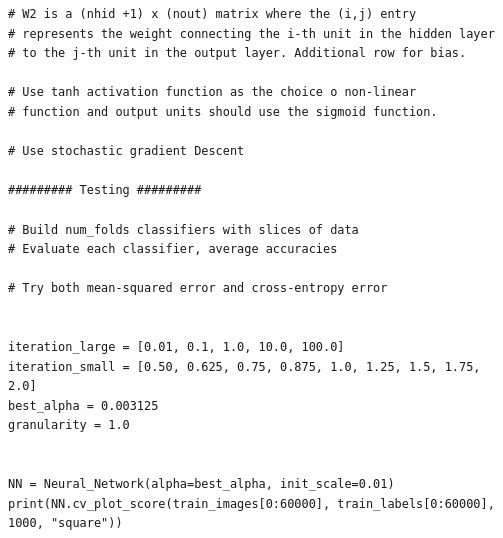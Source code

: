 \documentclass[11pt]{article}
\begin{document}
\begin{lstlisting}
# W2 is a (nhid +1) x (nout) matrix where the (i,j) entry
# represents the weight connecting the i-th unit in the hidden layer
# to the j-th unit in the output layer. Additional row for bias.

# Use tanh activation function as the choice o non-linear
# function and output units should use the sigmoid function.

# Use stochastic gradient Descent

######### Testing #########

# Build num_folds classifiers with slices of data
# Evaluate each classifier, average accuracies

# Try both mean-squared error and cross-entropy error


iteration_large = [0.01, 0.1, 1.0, 10.0, 100.0]
iteration_small = [0.50, 0.625, 0.75, 0.875, 1.0, 1.25, 1.5, 1.75, 2.0]
best_alpha = 0.003125
granularity = 1.0


NN = Neural_Network(alpha=best_alpha, init_scale=0.01)
print(NN.cv_plot_score(train_images[0:60000], train_labels[0:60000], 1000, "square"))
\end{lstlisting}
\end{document}
